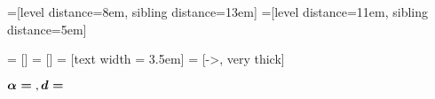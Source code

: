 \documentclass[table]{beamer}
\newcommand{\getconc}[1]{%
    \ifthenelse{\isundefined{\conc}}%
        {}%
        {\conc}%
}
\newcommand{\getdiscount}[1]{%
    \ifthenelse{\isundefined{\discount}}%
        {}%
        {\discount}%
}
\begin{document}
\begin{frame}[plain,label=dpp]
\begin{adjustwidth}{-2.3em}{-2.5em}

=[level distance=8em, sibling distance=13em]
=[level distance=11em, sibling distance=5em]

 = []
 = []
 = [text width = 3.5em]
 = [->, very thick]

\begin{center}
    {\LARGE $\boldsymbol{\alpha =} \mathbf{\getconc{}}, \boldsymbol{d =} \mathbf{\getdiscount{}}$} \\
\end{center}


\end{adjustwidth}
\end{frame}
\end{document}
